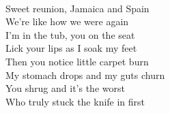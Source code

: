  \\
Sweet reunion, Jamaica and Spain \\
We're like how we were again \\
I'm in the tub, you on the seat \\

Lick your lips as I soak my feet \\
Then you notice little carpet burn \\
My stomach drops and my guts churn \\
You shrug and it's the worst \\
Who truly stuck the knife in first \\
